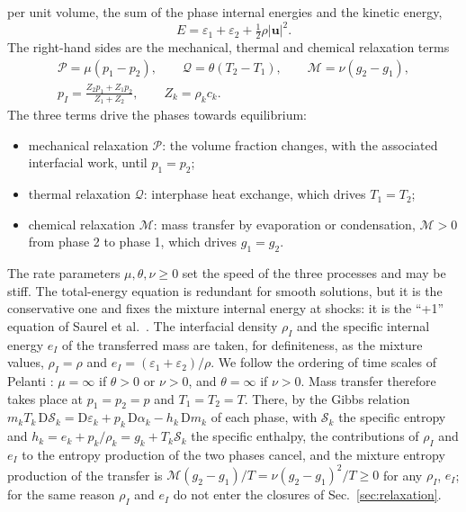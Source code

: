 per unit volume, the sum of the phase internal energies and the kinetic energy,
\begin{equation}
E=\varepsilon_1+\varepsilon_2+\tfrac12\rho|\mathbf u|^2 .
\label{eq:energy}
\end{equation}
The right-hand sides are the mechanical, thermal and chemical relaxation terms
\begin{equation}
\begin{gathered}
\mathcal P=\mu(p_1-p_2),\qquad \mathcal Q=\theta(T_2-T_1),\qquad \mathcal M=\nu(g_2-g_1),\\
p_I=\frac{Z_2p_1+Z_1p_2}{Z_1+Z_2},\qquad Z_k=\rho_kc_k .
\end{gathered}
\label{eq:sources}
\end{equation}
The three terms drive the phases towards equilibrium:
\begin{itemize}
\item mechanical relaxation $\mathcal P$: the volume fraction changes, with the associated interfacial work, until $p_1=p_2$;
\item thermal relaxation $\mathcal Q$: interphase heat exchange, which drives $T_1=T_2$;
\item chemical relaxation $\mathcal M$: mass transfer by evaporation or condensation, $\mathcal M>0$ from phase 2 to
phase 1, which drives $g_1=g_2$.
\end{itemize}
The rate parameters $\mu,\theta,\nu\ge0$ set the speed of the three processes and may be stiff. The total-energy equation is
redundant for smooth solutions, but it is the conservative one and fixes the mixture internal energy at shocks: it is
the ``+1'' equation of Saurel et al.\ \cite{SPB2009}. The interfacial density $\rho_I$ and the specific internal energy $e_I$ of the
transferred mass are taken, for definiteness, as the mixture values, $\rho_I=\rho$ and $e_I=(\varepsilon_1+\varepsilon_2)/\rho$. We follow the
ordering of time scales of Pelanti \cite{Pelanti2022}: $\mu=\infty$ if $\theta>0$ or $\nu>0$, and $\theta=\infty$ if $\nu>0$. Mass transfer
therefore takes place at $p_1=p_2=p$ and $T_1=T_2=T$. There, by the Gibbs relation
$m_kT_k\,\mathrm D\mathcal S_k=\mathrm D\varepsilon_k+p_k\,\mathrm D\alpha_k-h_k\,\mathrm Dm_k$ of each phase, with $\mathcal S_k$ the
specific entropy and $h_k=e_k+p_k/\rho_k=g_k+T_k\mathcal S_k$ the specific enthalpy, the contributions of $\rho_I$ and $e_I$ to the entropy
production of the two phases cancel, and the mixture entropy production of the transfer is
$\mathcal M(g_2-g_1)/T=\nu(g_2-g_1)^2/T\ge0$ for any $\rho_I$, $e_I$; for the same reason $\rho_I$ and $e_I$ do not enter the closures of
Sec.~\ref{sec:relaxation}.

